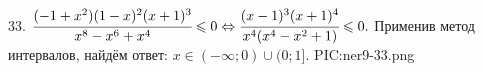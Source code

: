 33. $\cfrac{(-1+x^2)(1-x)^2(x+1)^3}{x^8-x^6+x^4}\leqslant0\Leftrightarrow\cfrac{(x-1)^3(x+1)^4}{x^4(x^4-x^2+1)}\leqslant0.$ Применив метод интервалов, найдём ответ: $x\in(-\infty;0)\cup(0;1].$
{{PIC:ner9-33.png}}\\

